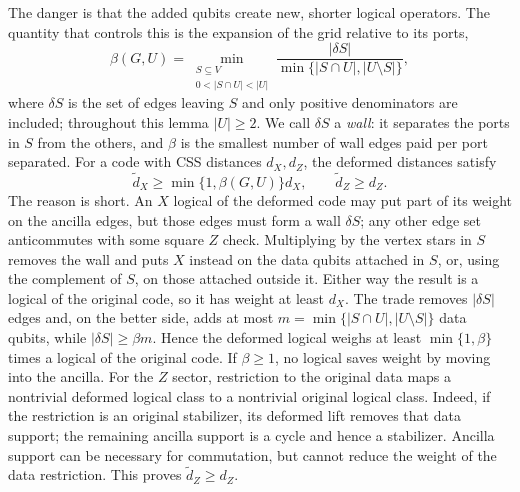 The danger is that the added qubits create new, shorter logical operators.
The quantity that controls this is the expansion of the grid relative to its
ports,
\begin{equation}
 \beta(G,U)=\min_{\substack{S\subseteq V\\0<|S\cap U|<|U|}}
 \frac{|\delta S|}{\min\{|S\cap U|,|U\setminus S|\}},
 \label{eq:beta}
\end{equation}
where $\delta S$ is the set of edges leaving $S$ and only positive
denominators are included; throughout this lemma $|U|\ge2$. We call $\delta S$ a \emph{wall}: it separates
the ports in $S$ from the others, and $\beta$ is the smallest number of wall
edges paid per port separated.  For a code with CSS distances $d_X,d_Z$, the
deformed distances satisfy
\begin{equation}
 \widetilde d_X\ge\min\{1,\beta(G,U)\}d_X,
 \qquad \widetilde d_Z\ge d_Z.
 \label{eq:gauge-distance}
\end{equation}
The reason is short.  An $X$ logical of the deformed code may put part of its
weight on the ancilla edges, but those edges must form a wall $\delta S$;
any other edge set anticommutes with some square $Z$ check.  Multiplying by
the vertex stars in $S$ removes the wall and puts $X$ instead on the data
qubits attached in $S$, or, using the complement of $S$, on those attached
outside it.  Either way the result is a logical of the original code, so it
has weight at least $d_X$.  The trade removes $|\delta S|$ edges and, on the
better side, adds at most $m=\min\{|S\cap U|,|U\setminus S|\}$ data qubits,
while $|\delta S|\ge\beta m$.  Hence the deformed logical weighs at least
$\min\{1,\beta\}$ times a logical of the original code.  If $\beta\ge1$, no
logical saves weight by moving into the ancilla.  For the $Z$ sector, restriction to the original data maps a nontrivial
deformed logical class to a nontrivial original logical class. Indeed, if
the restriction is an original stabilizer, its deformed lift removes that
data support; the remaining ancilla support is a cycle and hence a
stabilizer. Ancilla support can be necessary for commutation, but cannot
reduce the weight of the data restriction. This proves
$\widetilde d_Z\ge d_Z$.


